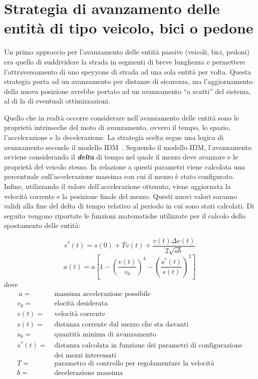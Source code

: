 \section{Strategia di avanzamento delle entità di tipo veicolo, bici o pedone}
Un primo approccio per l'avanzamento delle entità passive (veicoli, bici,
pedoni) era quello di suddividere la strada in segmenti di breve lunghezza e
permettere l'attraversamento di uno speyyone di strada ad una sola entità per
volta.
Questa strategia porta ad un avanzamento per distanze di sicurezza, ma
l'aggiornamento della nuova posizione avrebbe portato ad un avanzamento ``a
scatti'' del sistema, al di la di eventuali ottimizzazioni.

Quello che in realtà occorre considerare nell'avanzamento delle entità sono le
proprietà intrinseche del moto di avanzamento, ovvero il tempo, lo spazio,
l'accelerazione e la decelerazione. La strategia scelta segue una logica di
avanzamento secondo il modello \ac{IDM}~\cite{treiber2000microscopic}.
Seguendo il modello \ac{IDM}, l'avanzamento avviene considerando il
\textbf{\textit{delta}} di tempo nel quale il mezzo deve avanzare e le proprietà
del veicolo stesso. In relazione a questi parametri viene calcolata una
percentuale sull'accelerazione massima con cui il mezzo è stato configurato.
Infine, utilizzando il valore dell'accelerazione ottenuto, viene aggiornata la
velocità corrente e la posizione finale del mezzo.
Questi nuovi valori saranno validi alla fine del delta di tempo relativo al
periodo in cui sono stati calcolati. Di seguito vengono riportate le funzioni
matematiche utilizzate per il calcolo dello spostamento delle entità:

\begin{equation}
s^{*}(t)=s(0)+Tv(t)+\frac{v(t)\Delta{v(t)}}{2\sqrt{ab}}
\end{equation}
\begin{equation}
a(t)=a[1-(\frac{v(t)}{v_{0}})^4-(\frac{s^{*}(t)}{s(t)})^2]
\end{equation}
dove
\begin{align*}
~a =&~\text{massima accelerazione possibile}\\
v_{0} =&~ \text{elocità desiderata} \\
v(t) =&~ \text{velocità corrente} \\
s(t) =&~ \text{distanza corrente dal mezzo che sta davanti} \\
s_{0} =&~ \text{quantità minima di avanzamento} \\
s^*(t) =&~ \text{distanza calcolata in funzione dei parametri di configurazione}
\\ &~ \text{dei mezzi interessati} \\
T =&~ \text{parametro di controllo per regolamentare la velocità} \\
b =&~ \text{decelerazione massima}
\end{align*}

